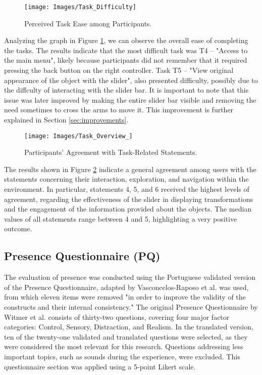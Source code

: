 \begin{figure}[h!]
    \centering
    \texttt{[image: Images/Task\_Difficulty]}
    \caption{Perceived Task Ease among Participants.} 
    \label{fig:diffculty}
\end{figure}

Analyzing the graph in Figure \ref{fig:diffculty}, we can observe the overall ease of completing the tasks.
The results indicate that the most difficult task was T4 – "Access to the main menu", likely because participants did not remember that it required pressing the back button on the right controller. 
Task T5 – "View original appearance of the object with the slider", also presented difficulty, possibly due to the diffculty of interacting with the slider bar. 
It is important to note that this issue was later improved by making the entire slider bar visible and removing the need sometimes to cross the arms to move it. 
This improvement is further explained in Section \ref{sec:improvements}.


\begin{figure}[h!]
    \centering
    \texttt{[image: Images/Task\_Overview\_]}
    \caption{Participants’ Agreement with Task-Related Statements.} 
    \label{fig:overview}
\end{figure}
\FloatBarrier


The results shown in Figure \ref{fig:overview} indicate a general agreement among users with the statements concerning their interaction, exploration, and navigation within the environment.
In particular, statements 4, 5, and 6 received the highest levels of agreement, regarding the effectiveness of the slider in displaying transformations and the engagement of the information provided about the objects.
The median values of all statements range between 4 and 5, highlighting a very positive outcome.

\subsection{Presence Questionnaire (PQ)}

The evaluation of presence was conducted using the Portuguese validated version of the Presence Questionnaire, adapted by Vasconcelos-Raposo et al. \cite{Vasconcelos-Raposo03102021} was used, from which eleven items were removed 
"in order to improve the validity of the constructs and their internal consistency."
The original Presence Questionnaire by Witmer et al. \cite{10.1162/105474698565686} consists of thirty-two questions, covering four major factor categories: Control, Sensory, Distraction, and Realism.
In the translated version, ten of the twenty-one validated and translated questions were selected, as they were considered the most relevant for this research. 
Questions addressing less important topics, such as sounds during the experience, were excluded. This questionnaire section was applied using a 5-point Likert scale.

